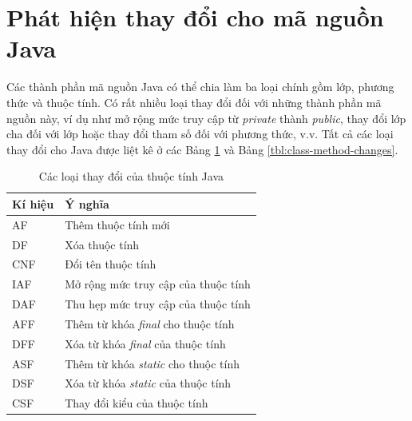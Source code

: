 \documentclass[12pt]{report}
\begin{document}
\section{Phát hiện thay đổi cho mã nguồn Java}
Các thành phần mã nguồn Java có thể chia làm ba loại chính gồm lớp, phương thức và thuộc tính. Có rất nhiều loại thay đổi đối với những thành phần mã nguồn này, ví dụ như mở rộng mức truy cập từ \textit{private} thành \textit{public}, thay đổi lớp cha đối với lớp hoặc thay đổi tham số đối với phương thức, v.v. Tất cả các loại thay đổi cho Java được liệt kê ở các Bảng \ref{tbl:field-ct} và Bảng \ref{tbl:class-method-changes}.


\begin{table}[h]
	\centering
	\caption{Các loại thay đổi của thuộc tính Java}
	\label{tbl:field-ct}
	\begin{tabular}{|l|l|}
		\hline
		\textbf{Kí hiệu} & \textbf{Ý nghĩa}                                        \\ \hline
		AF               & Thêm thuộc tính mới                                            \\ \hline
		DF               & Xóa thuộc tính                                                 \\
		\hline
		CNF               & Đổi tên thuộc tính                                                 \\
		\hline
		IAF              & Mở rộng mức truy cập của thuộc tính                            \\ \hline
		DAF              & Thu hẹp mức truy cập của thuộc tính                            \\ \hline
		AFF              & Thêm từ khóa \textit{final} cho thuộc tính    \\ \hline
		DFF              & Xóa từ khóa \textit{final} của thuộc tính     \\ \hline
		ASF              & Thêm từ khóa \textit{static} cho thuộc tính   \\ \hline
		DSF              & Xóa từ khóa \textit{static} của thuộc tính    \\ \hline
		CSF              & Thay đổi kiểu của thuộc tính    \\ \hline
	\end{tabular}
\end{table}
\end{document}
